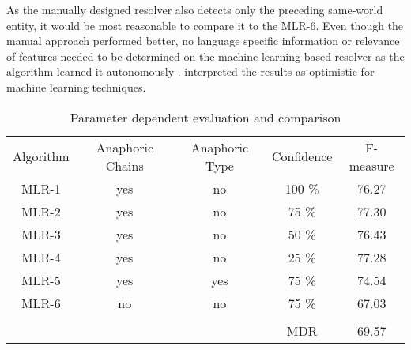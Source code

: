 As the manually designed resolver also detects only the preceding same-world entity, it would be most reasonable to compare it to the MLR-6. Even though the manual approach performed better, no language specific information or relevance of features needed to be determined on the machine learning-based resolver as the algorithm learned it autonomously \citep{aone1995evaluating}. \cite{aone1995evaluating} interpreted the results as optimistic for machine learning techniques.


\begin{table}[h]
  \caption{Parameter dependent evaluation and comparison}
\begin{tabular}{|c|c|c|c|c|}
	\cline{1-5}
	Algorithm & Anaphoric Chains & Anaphoric Type& Confidence & F-measure \\ \cline{1-5}
	\cline{1-5}
	MLR-1 & yes & no & 100 \% &  76.27 \\ \cline{1-5}
	MLR-2 & yes & no & 75 \% & 77.30 \\ \cline{1-5}
	MLR-3 & yes & no & 50 \% & 76.43 \\ \cline{1-5}
	MLR-4 & yes & no & 25 \% & 77.28 \\ \cline{1-5}
	MLR-5 & yes & yes & 75 \% & 74.54 \\ \cline{1-5}
	MLR-6 & no & no & 75 \% & 67.03 \\ \cline{1-5}
	\multicolumn{5}{r}{}\\ \cline{4-5}
	\multicolumn{2}{r}{} & &  MDR & 69.57 \\
\cline{4-5}
	\end{tabular}

     \label{table:aone1995evals}
\end{table}


